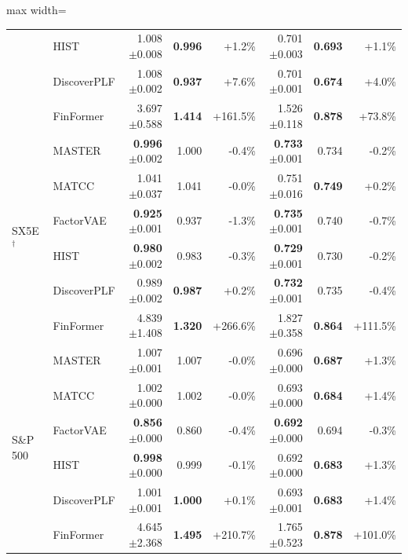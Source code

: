\begin{table}[tb]
\begin{adjustbox}{max width=\textwidth}
{\begin{tabular}{llrrrrrr}
 & HIST & 1.008 {\scriptsize$\pm$0.008} & \textbf{0.996} & +1.2\% & 0.701 {\scriptsize$\pm$0.003} & \textbf{0.693} & +1.1\% \\
 & DiscoverPLF & 1.008 {\scriptsize$\pm$0.002} & \textbf{0.937} & +7.6\% & 0.701 {\scriptsize$\pm$0.001} & \textbf{0.674} & +4.0\% \\
 & FinFormer & 3.697 {\scriptsize$\pm$0.588} & \textbf{1.414} & +161.5\% & 1.526 {\scriptsize$\pm$0.118} & \textbf{0.878} & +73.8\% \\
\midrule
\multirow{6}{*}{SX5E$^\dagger$} & MASTER & \textbf{0.996} {\scriptsize$\pm$0.002} & 1.000 & -0.4\% & \textbf{0.733} {\scriptsize$\pm$0.001} & 0.734 & -0.2\% \\
 & MATCC & 1.041 {\scriptsize$\pm$0.037} & 1.041 & -0.0\% & 0.751 {\scriptsize$\pm$0.016} & \textbf{0.749} & +0.2\% \\
 & FactorVAE & \textbf{0.925} {\scriptsize$\pm$0.001} & 0.937 & -1.3\% & \textbf{0.735} {\scriptsize$\pm$0.001} & 0.740 & -0.7\% \\
 & HIST & \textbf{0.980} {\scriptsize$\pm$0.002} & 0.983 & -0.3\% & \textbf{0.729} {\scriptsize$\pm$0.001} & 0.730 & -0.2\% \\
 & DiscoverPLF & 0.989 {\scriptsize$\pm$0.002} & \textbf{0.987} & +0.2\% & \textbf{0.732} {\scriptsize$\pm$0.001} & 0.735 & -0.4\% \\
 & FinFormer & 4.839 {\scriptsize$\pm$1.408} & \textbf{1.320} & +266.6\% & 1.827 {\scriptsize$\pm$0.358} & \textbf{0.864} & +111.5\% \\
\midrule
\multirow{6}{*}{S\&P 500} & MASTER & 1.007 {\scriptsize$\pm$0.001} & 1.007 & -0.0\% & 0.696 {\scriptsize$\pm$0.000} & \textbf{0.687} & +1.3\% \\
 & MATCC & 1.002 {\scriptsize$\pm$0.000} & 1.002 & -0.0\% & 0.693 {\scriptsize$\pm$0.000} & \textbf{0.684} & +1.4\% \\
 & FactorVAE & \textbf{0.856} {\scriptsize$\pm$0.000} & 0.860 & -0.4\% & \textbf{0.692} {\scriptsize$\pm$0.000} & 0.694 & -0.3\% \\
 & HIST & \textbf{0.998} {\scriptsize$\pm$0.000} & 0.999 & -0.1\% & 0.692 {\scriptsize$\pm$0.000} & \textbf{0.683} & +1.3\% \\
 & DiscoverPLF & 1.001 {\scriptsize$\pm$0.001} & \textbf{1.000} & +0.1\% & 0.693 {\scriptsize$\pm$0.001} & \textbf{0.683} & +1.4\% \\
 & FinFormer & 4.645 {\scriptsize$\pm$2.368} & \textbf{1.495} & +210.7\% & 1.765 {\scriptsize$\pm$0.523} & \textbf{0.878} & +101.0\% \\

\end{tabular}}
\end{adjustbox}
\end{table}
